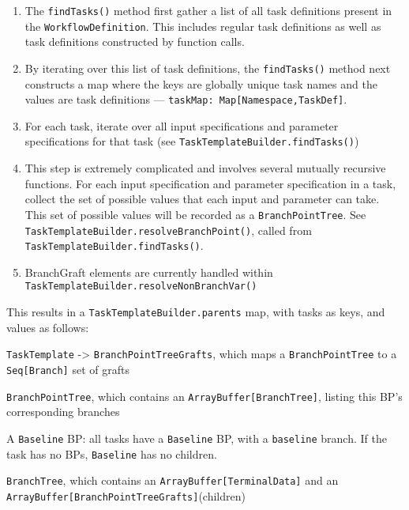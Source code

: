 \documentclass{report}
\begin{document}
\begin{enumerate}

\item The \texttt{findTasks()} method first gather a list of all task definitions present in the \texttt{WorkflowDefinition}. This includes regular task definitions as well as task definitions constructed by function calls.

\item By iterating over this list of task definitions, the \texttt{findTasks()} method next constructs a map where 
      the keys are globally unique task names and 
      the values are task definitions --- \texttt{taskMap: Map[Namespace,TaskDef]}.

\item For each task, iterate over all input specifications and parameter specifications for that task
      (see \texttt{TaskTemplateBuilder.findTasks()})

\item This step is extremely complicated and involves several mutually recursive functions.
      For each input specification and parameter specification in a task, 
      collect the set of possible values that each input and parameter can take. 
      This set of possible values will be recorded as a \texttt{BranchPointTree}.
      See \texttt{TaskTemplateBuilder.resolveBranchPoint()}, called from \texttt{TaskTemplateBuilder.findTasks()}.
      
\item BranchGraft elements are currently handled within \texttt{TaskTemplateBuilder.resolveNonBranchVar()}

\end{enumerate}

This results in a \texttt{TaskTemplateBuilder.parents} map, with tasks as keys, and values as follows:

\texttt{TaskTemplate} -> \texttt{BranchPointTreeGrafts}, which maps a \texttt{BranchPointTree} to a \texttt{Seq[Branch]} set of grafts
    
    \quad \texttt{BranchPointTree}, which contains an \texttt{ArrayBuffer[BranchTree]}, listing this BP's corresponding branches
    
    \quad A \texttt{Baseline} BP: all tasks have a \texttt{Baseline} BP, with a \texttt{baseline} branch. If the task has no BPs, \texttt{Baseline} has no children.
        
        \quad \quad \texttt{BranchTree}, which contains an \texttt{ArrayBuffer[TerminalData]} and an \texttt{ArrayBuffer[BranchPointTreeGrafts]}(children)
        
\end{document}
